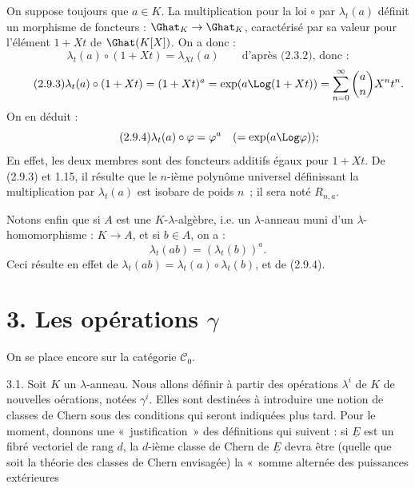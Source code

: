 
On
suppose toujours que \(a\in K\). La multiplication pour la loi \(\circ\) par \(\lambda_t(a)\) définit un morphisme de foncteurs : \(\Ghat_K\to\Ghat_K\), caractérisé par sa valeur pour l'élément \(1+Xt\) de \(\Ghat(K[X])\). On a donc :
\[
  \lambda_t(a)\circ(1+Xt)=\lambda_{Xt}(a)\qquad\text{d'après (2.3.2), donc :}
\]
\begin{equation}\tag{2.9.3}
  \lambda_t(a)\circ(1+Xt)
  =(1+Xt)^a
  =\exp(a\Log(1+Xt))
  =\sum_{n=0}^{\infty}\binom{a}{n}X^nt^n .
\end{equation}
On en déduit :
\begin{equation}\tag{2.9.4}
  \lambda_t(a)\circ\varphi=\varphi^a
  \quad(=\exp(a\Log\varphi)) ;
\end{equation}
En effet, les deux membres sont des foncteurs additifs égaux pour \(1+Xt\). De (2.9.3) et 1.15, il résulte que le \(n\)-ième polynôme universel définissant la multiplication par \(\lambda_t(a)\) est isobare de poids \(n\)~; il sera noté \(R_{n,a}\).

Notons enfin que si \(A\) est une \(K\)-\(\lambda\)-algèbre, i.e. un \(\lambda\)-anneau muni d'un \(\lambda\)-homomorphisme : \(K\to A\), et si \(b\in A\), on a :
\begin{equation}\tag{2.9.5}
  \lambda_t(ab)=(\lambda_t(b))^a .
\end{equation}
Ceci résulte en effet de \(\lambda_t(ab)=\lambda_t(a)\circ\lambda_t(b)\), et de (2.9.4).

\section*{3. Les opérations \(\gamma\)}

On se place encore sur la catégorie \(\mathcal C_0\).

3.1. Soit \(K\) un \(\lambda\)-anneau. Nous allons définir à partir des opérations \(\lambda^i\) de \(K\) de nouvelles oérations, notées \(\gamma^i\). Elles sont destinées à introduire une notion de classes de Chern sous des conditions qui seront indiquées plus tard. Pour le moment, donnons une «~justification~» des définitions qui suivent : si \(\underline{E}\) est un fibré vectoriel de rang \(d\), la \(d\)-ième classe de Chern de \(\underline{E}\) devra être (quelle que soit la théorie des classes de Chern envisagée) la «~somme alternée des puissances extérieures 
